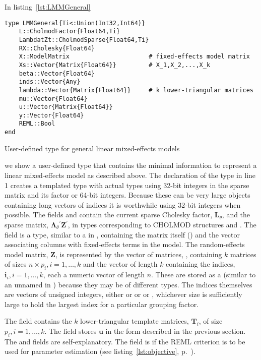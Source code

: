 \documentclass{jss}
\newcommand{\bLt}{\ensuremath{\bm\Lambda_\theta}}
\newcommand{\trans}{\ensuremath{^\prime}}
\begin{document}
In listing~\ref{lst:LMMGeneral}
\begin{listing}[tbp]
  \begin{verbatim}
type LMMGeneral{Ti<:Union(Int32,Int64)}
    L::CholmodFactor{Float64,Ti}
    LambdatZt::CholmodSparse{Float64,Ti}
    RX::Cholesky{Float64}
    X::ModelMatrix                      # fixed-effects model matrix
    Xs::Vector{Matrix{Float64}}         # X_1,X_2,...,X_k
    beta::Vector{Float64}
    inds::Vector{Any}
    lambda::Vector{Matrix{Float64}}     # k lower-triangular matrices
    mu::Vector{Float64}
    u::Vector{Matrix{Float64}}
    y::Vector{Float64}
    REML::Bool
end
  \end{verbatim}
  \caption{User-defined  type for general linear
    mixed-effects models}
  \label{lst:LMMGeneral}
\end{listing}
we show a  user-defined type that contains the minimal
information to represent a linear mixed-effects model as described
above.  The declaration of the type in line 1 creates a templated type
with actual types using 32-bit integers in the sparse matrix and its
factor or 64-bit integers.  Because these can be very large objects
containing long vectors of indices it is worthwhile using 32-bit
integers when possible.  The fields  and 
contain the current sparse Cholesky factor, $\bm L_\theta$, and the
sparse matrix, $\bLt\trans\bm Z\trans$, in  types
corresponding to CHOLMOD structures  and
.  The  field is a 
type, similar to a  in , containing the
matrix itself () and the  vector associating
columns with fixed-effects terms in the model.  The random-effects
model matrix, $\bm Z$, is represented by the vector of matrices,
, containing $k$ matrices of sizes $n\times p_i,i=1,\dots,k$
and the  vector of length $k$ containing the indices, $\bm
i_i,i=1,\dots,k$, each a numeric vector of length $n$.  These are
stored as a  (similar to an unnamed  in
) because they may be of different types.  The indices
themselves are vectors of unsigned integers, either  or
 or  or , whichever size is
sufficiently large to hold the largest index for a particular grouping
factor.

The  field contains the $k$ lower-triangular template
matrices, $\bm T_i$, of size $p_i,i=1,\dots,k$.  The  field
stores $\bm u$ in the form described in the previous section.  The
 and  fields are self-explanatory.  The 
field is  if the REML criterion is to be used for parameter
estimation (see listing~\ref{lst:objective}, p.~\pageref{lst:objective}).
\end{document}
